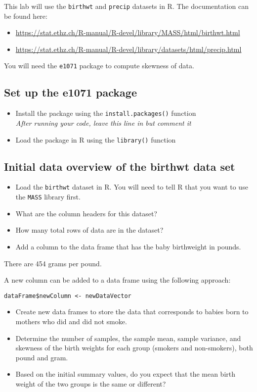 \documentclass{article}
\begin{document}
This lab will use the \texttt{birthwt} and \texttt{precip} datasets in R. The documentation can be found here:
\begin{itemize}
    \item \url{https://stat.ethz.ch/R-manual/R-devel/library/MASS/html/birthwt.html}
    \item \url{https://stat.ethz.ch/R-manual/R-devel/library/datasets/html/precip.html}
\end{itemize}

You will need the \texttt{e1071} package to compute skewness of data.

\subsection*{Set up the e1071 package}
\begin{itemize}
    \item Install the package using the \texttt{install.packages()} function \\
    \textit{After running your code, leave this line in but comment it}
    \item Load the package in R using the \texttt{library()} function
\end{itemize}

\subsection*{Initial data overview of the birthwt data set}
\begin{itemize}
    \item Load the \texttt{birthwt} dataset in R. You will need to tell R that you want to use the \texttt{MASS} library first.
    \item What are the column headers for this dataset?
    \item How many total rows of data are in the dataset?
    \item Add a column to the data frame that has the baby birthweight in pounds.  
\end{itemize}

There are 454 grams per pound.

A new column can be added to a data frame using the following approach:
\begin{center}
    \texttt{dataFrame\$newColumn <- newDataVector}
\end{center}

\begin{itemize}
    \item Create new data frames to store the data that corresponds to babies born to mothers who did and did not smoke.
    \item Determine the number of samples, the sample mean, sample variance, and skewness of the birth weights for each group (smokers and non-smokers), both pound and gram.
    \item Based on the initial summary values, do you expect that the mean birth weight of the two groups is the same or different?
\end{itemize}
\end{document}
